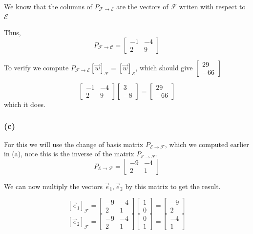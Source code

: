 \documentclass{article}
\begin{document}
We know that the columns of \(P_{\mathcal{F}\rightarrow \mathcal{E}}\) are the vectors of 
\(\mathcal{F}\) writen with respect to \(\mathcal{E}\)

Thus,
\[
P_{\mathcal{F}\rightarrow \mathcal{C}} = \begin{bmatrix}
    -1 & -4 \\
    2 & 9
\end{bmatrix}
\]

To verify we compute \(P_{\mathcal{F}\rightarrow 
\mathcal{E}}[\vec{w}]_\mathcal{F} = [\vec{w}]_\mathcal{E}\), which should give 
\(\begin{bmatrix}
    29 \\ -66
\end{bmatrix}\)

\[
\begin{bmatrix}
    -1 & -4 \\
    2 & 9 
\end{bmatrix} \begin{bmatrix}
    3 \\ -8
\end{bmatrix} = \begin{bmatrix}
    29 \\ -66
\end{bmatrix}
\]
which it does.

\subsubsection*{(c)}

For this we will use the change of basis matrix \(P_{\mathcal{E}\rightarrow \mathcal{F}}\),
which we computed earlier in (a), note this is the inverse of the matrix 
\(P_{\mathcal{E}\rightarrow \mathcal{F}}\).
\[
P_{\mathcal{E}\rightarrow \mathcal{F}} = \begin{bmatrix}
        -9 & -4 \\
        2 & 1
    \end{bmatrix}
\]

We can now multiply the vectors \(\vec{e}_1, \vec{e}_2\) by this matrix to get the result.

\[
[\vec{e}_1]_\mathcal{F} = \begin{bmatrix}
        -9 & -4 \\
        2 & 1
    \end{bmatrix} \begin{bmatrix}
        1 \\ 0
    \end{bmatrix} = \begin{bmatrix}
        -9 \\ 2
    \end{bmatrix}
\]
\[
[\vec{e}_2]_\mathcal{F} = \begin{bmatrix}
        -9 & -4 \\
        2 & 1
    \end{bmatrix} \begin{bmatrix}
        0 \\ 1
    \end{bmatrix} = \begin{bmatrix}
        -4 \\ 1
    \end{bmatrix}
\]
\end{document}
